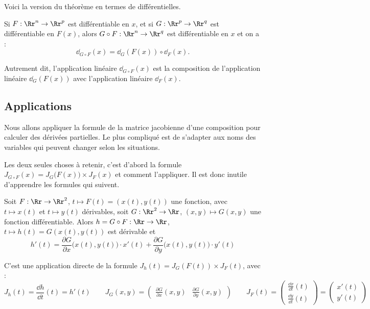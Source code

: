 \documentclass[12pt, class=report,crop=false]{standalone}
\begin{document}
\bigskip

Voici la version du théorème en termes de différentielles.
\begin{theoreme}
Si $F : \Rr^n \to \Rr^p$ est différentiable en $x$, et si $G: \Rr^p \to \Rr^q$ est différentiable en $F(x)$, alors $G \circ F : \Rr^n \to \Rr^q$ est différentiable en $x$ et on a : 
$$
\dd_{G \circ F} (x) = \dd_{G} (F(x)) \circ \dd_F (x).
$$
\end{theoreme}

Autrement dit, l'application linéaire $\dd_{G \circ F} (x)$ est la composition de l'application linéaire $\dd_{G} (F(x))$ avec l'application linéaire $\dd_F (x)$.

\subsection{Applications}


Nous allons appliquer la formule de la matrice jacobienne d'une composition pour calculer des dérivées partielles. Le plus compliqué est de s'adapter aux noms des variables qui peuvent changer selon les situations.

Les deux seules choses à retenir, c'est d'abord la formule
$J_{G \circ F} (x) = J_G \big( F(x) \big) \times J_F (x)$
et comment l'appliquer. Il est donc inutile d'apprendre les formules qui suivent.

\bigskip



\begin{proposition}
Soit $F : \Rr \to \Rr^2$, $t \mapsto F(t)=(x(t),y(t))$ une fonction, avec $t\mapsto x(t)$ et $t \mapsto y(t)$ dérivables, soit $G : \Rr^2 \to \Rr$, $(x,y) \mapsto G(x,y)$  une fonction différentiable.
Alors $h = G \circ F : \Rr \to \Rr$, $t \mapsto h(t)= G( x(t), y(t))$ est dérivable et
$$h'(t) =  
\frac{\partial G}{\partial x}\big( x(t), y(t) \big) \cdot x'(t) +
\frac{\partial G}{\partial y}\big( x(t), y(t) \big) \cdot y'(t) 
$$
\end{proposition}

C'est une application directe de la formule
$J_h (t) = J_G ( F(t) ) \times J_F (t)$, avec :
$$J_h(t) = \frac{\dd h}{\dd t}(t) = h'(t) \qquad
J_G(x,y) = \begin{pmatrix} \frac{\partial G}{\partial x}(x,y)
&  \frac{\partial G}{\partial y}(x,y) \end{pmatrix} \qquad
J_F (t) = \begin{pmatrix} \frac{\dd x}{\dd t}(t) \\  \frac{\dd y}{\dd t}(t) \end{pmatrix}
= \begin{pmatrix} x'(t) \\ y'(t) \end{pmatrix}$$ 
\end{document}
